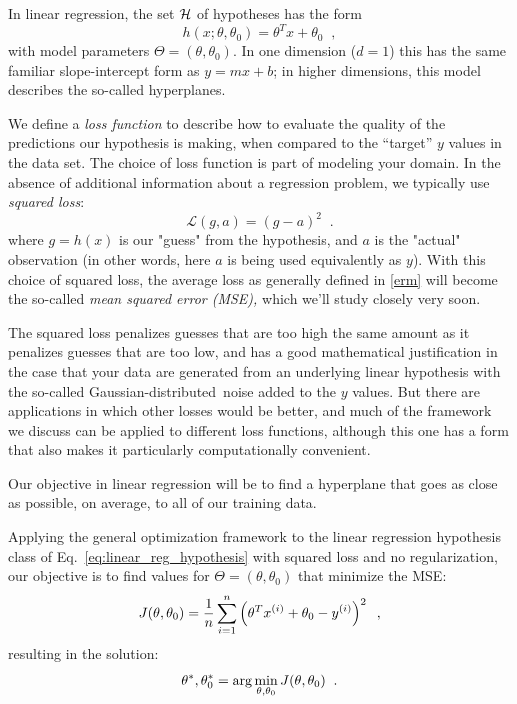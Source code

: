 In linear regression, the set ${\cal H}$ of hypotheses has the form
\begin{equation}
  h(x;\theta, \theta_0) = \theta^Tx + \theta_0
  \;\;,
  \label{eq:linear_reg_hypothesis}
\end{equation}
%
with model parameters $\Theta = (\theta, \theta_0)$.   In one
dimension ($d = 1$) this has the same familiar slope-intercept form as $y = mx + b$; in higher dimensions, this model describes the so-called hyperplanes.

We define a {\em loss function}
to describe how to evaluate
the quality of the predictions our hypothesis is making, when compared
to the ``target'' $y$ values in the data set.  The choice of loss
function is part of modeling your domain.  In the absence of
additional information about a regression problem, we typically use
  {\em squared loss}:
\[\mathcal{L}(g, a) = (g - a)^2\;\;.\]
where $g=h(x)$ is our "guess" from the hypothesis, and $a$ is the "actual" observation (in other words, here $a$ is being used equivalently as $y$). With this choice of squared loss, the average loss as generally defined in \ref{erm} will become the so-called {\em mean squared error (MSE),} which we'll study closely very soon.

The squared loss penalizes guesses that are too high the
same amount as it penalizes guesses that are too low, and has a good
mathematical justification in the case that your data are generated
from an underlying linear hypothesis with the so-called Gaussian-distributed\
noise added to the $y$ values. But there are applications
in which other losses would be better, and much of the framework we
discuss can be applied to different loss functions, although this one
has a form that also makes it particularly computationally convenient.

Our objective in linear regression will be to find a hyperplane that
goes as close as possible, on average, to all of our training data.

Applying the general optimization framework to the linear regression
hypothesis class of
Eq.~\ref{eq:linear_reg_hypothesis} with squared loss and no regularization,
our objective is to find values for
$\Theta = (\theta, \theta_0)$ that minimize the MSE:
\begin{equation}
  J(\theta, \theta_0) = \frac{1}{n}\sum_{i =
    1}^n\left(\theta^Tx^{(i)} + \theta_0 - y^{(i)}\right)^2 \;\;,
  \label{eq:reg_mse_withconst}
\end{equation}
resulting in the solution:
\begin{equation}
  \theta^*, \theta_0^* = {\rm arg}\min_{\theta, \theta_0} J(\theta,
  \theta_0)\;\;.
  \label{olsObjective}
\end{equation}

